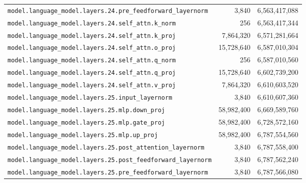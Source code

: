 \documentclass[10pt,a4paper]{article}
\theoremstyle{definition}
\begin{document}
\begin{appendices}
\begin{longtable}{p{9.5cm}rr}
\texttt{model.\allowbreak{}language\_model.\allowbreak{}layers.\allowbreak{}24.\allowbreak{}pre\_feedforward\_layernorm} & 3,840 & 6,563,417,088 \\
\texttt{model.\allowbreak{}language\_model.\allowbreak{}layers.\allowbreak{}24.\allowbreak{}self\_attn.\allowbreak{}k\_norm} & 256 & 6,563,417,344 \\
\texttt{model.\allowbreak{}language\_model.\allowbreak{}layers.\allowbreak{}24.\allowbreak{}self\_attn.\allowbreak{}k\_proj} & 7,864,320 & 6,571,281,664 \\
\texttt{model.\allowbreak{}language\_model.\allowbreak{}layers.\allowbreak{}24.\allowbreak{}self\_attn.\allowbreak{}o\_proj} & 15,728,640 & 6,587,010,304 \\
\texttt{model.\allowbreak{}language\_model.\allowbreak{}layers.\allowbreak{}24.\allowbreak{}self\_attn.\allowbreak{}q\_norm} & 256 & 6,587,010,560 \\
\texttt{model.\allowbreak{}language\_model.\allowbreak{}layers.\allowbreak{}24.\allowbreak{}self\_attn.\allowbreak{}q\_proj} & 15,728,640 & 6,602,739,200 \\
\texttt{model.\allowbreak{}language\_model.\allowbreak{}layers.\allowbreak{}24.\allowbreak{}self\_attn.\allowbreak{}v\_proj} & 7,864,320 & 6,610,603,520 \\
\texttt{model.\allowbreak{}language\_model.\allowbreak{}layers.\allowbreak{}25.\allowbreak{}input\_layernorm} & 3,840 & 6,610,607,360 \\
\texttt{model.\allowbreak{}language\_model.\allowbreak{}layers.\allowbreak{}25.\allowbreak{}mlp.\allowbreak{}down\_proj} & 58,982,400 & 6,669,589,760 \\
\texttt{model.\allowbreak{}language\_model.\allowbreak{}layers.\allowbreak{}25.\allowbreak{}mlp.\allowbreak{}gate\_proj} & 58,982,400 & 6,728,572,160 \\
\texttt{model.\allowbreak{}language\_model.\allowbreak{}layers.\allowbreak{}25.\allowbreak{}mlp.\allowbreak{}up\_proj} & 58,982,400 & 6,787,554,560 \\
\texttt{model.\allowbreak{}language\_model.\allowbreak{}layers.\allowbreak{}25.\allowbreak{}post\_attention\_layernorm} & 3,840 & 6,787,558,400 \\
\texttt{model.\allowbreak{}language\_model.\allowbreak{}layers.\allowbreak{}25.\allowbreak{}post\_feedforward\_layernorm} & 3,840 & 6,787,562,240 \\
\texttt{model.\allowbreak{}language\_model.\allowbreak{}layers.\allowbreak{}25.\allowbreak{}pre\_feedforward\_layernorm} & 3,840 & 6,787,566,080 \\

\end{longtable}
\end{appendices}
\end{document}
